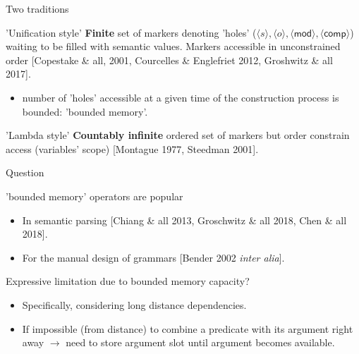 \documentclass{beamer}
\begin{document}
\begin{frame}{Two traditions}
  \begin{block}{'Unification style'}
    \textbf{Finite} set of markers denoting 'holes' ($\langle s \rangle, \langle o \rangle, \langle \textsf{mod} \rangle, \langle \textsf{comp} \rangle$) waiting to be filled with semantic values. Markers accessible in unconstrained order [Copestake \& all, 2001, Courcelles \& Englefriet 2012, Groshwitz \& all 2017]. 
  \end{block}
  \begin{itemize}
  \item<2>[\alert{$\rightarrow$}] number of 'holes' accessible at a given time of the construction process is bounded: '\alert{bounded memory}'.
  \end{itemize}
  \begin{block}{'Lambda style'}
    \textbf{Countably infinite} ordered set of markers but order constrain access (variables' scope) [Montague 1977, Steedman 2001].
  \end{block}
\end{frame}

\begin{frame}{Question}
  \begin{block}{'bounded memory' operators are popular}
  \begin{itemize}
  \item In semantic parsing [Chiang \& all 2013, Groschwitz \& all 2018, Chen \& all 2018].
  \item For the manual design of grammars [Bender 2002 \emph{inter alia}].
  \end{itemize}
  \end{block}

  \begin{alertblock}{Expressive limitation due to bounded memory capacity?}
    \begin{itemize}
    \item Specifically, considering long distance dependencies.
    \item If impossible (from distance) to combine a predicate with its argument right away $\rightarrow$ need to store argument slot until argument becomes available.
    \end{itemize}
  \end{alertblock}
\end{frame}
\end{document}
